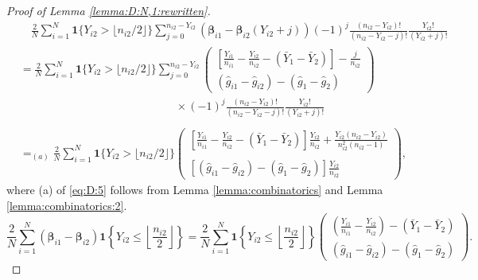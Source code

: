 \documentclass[10pt,a4paper]{amsart}
\begin{document}
\begin{proof}[Proof of Lemma \ref{lemma:D:N,1:rewritten}]
\begin{equation}\label{eq:D:5}
\begin{array}{rl}
&\displaystyle\quad\frac{2}{N}\sum_{i=1}^N\mathbf{1}\{Y_{i2} > \lfloor n_{i2}/2\rfloor\}\!\!\!\sum_{j=0}^{n_{i2}-Y_{i2}}\!\!\!(\boldsymbol{\beta}_{i1}-\boldsymbol{\beta}_{i2}(Y_{i2}+j))(-1)^{j}\frac{(n_{i2}-Y_{i2})!}{(n_{i2}-Y_{i2}-j)!}\frac{Y_{i2}!}{(Y_{i2}+j)!}\\
&\displaystyle=\frac{2}{N}\sum_{i=1}^N\mathbf{1}\{Y_{i2} > \lfloor n_{i2}/2\rfloor\}\!\!\!\sum_{j=0}^{n_{i2}-Y_{i2}}\!\!\!\begin{pmatrix}
\displaystyle\left[\frac{Y_{i1}}{n_{i1}}-\frac{Y_{i2}}{n_{i2}}-(\bar{Y}_1-\bar{Y}_2)\right]-\frac{j}{n_{i2}}\\
(\hat{g}_{i1}-\hat{g}_{i2})-(\hat{g}_1-\hat{g}_2)
\end{pmatrix}\\
&\quad\quad\quad\quad\quad\quad\quad\quad\quad\quad\quad\quad\quad\quad\displaystyle\times(-1)^{j}\frac{(n_{i2}-Y_{i2})!}{(n_{i2}-Y_{i2}-j)!}\frac{Y_{i2}!}{(Y_{i2}+j)!}\\
\\
&\displaystyle=_{(a)}\frac{2}{N}\sum_{i=1}^N\mathbf{1}\{Y_{i2} > \lfloor n_{i2}/2\rfloor\}\begin{pmatrix}
\displaystyle\left[\frac{Y_{i1}}{n_{i1}}-\frac{Y_{i2}}{n_{i2}}-(\bar{Y}_1-\bar{Y}_2)\right]\frac{Y_{i2}}{n_{i2}}+\frac{Y_{i2}(n_{i2}-Y_{i2})}{n_{i2}^2(n_{i2}-1)}\\
\\
\displaystyle[(\hat{g}_{i1}-\hat{g}_{i2})-(\hat{g}_1-\hat{g}_2)]\frac{Y_{i2}}{n_{i2}}
\end{pmatrix},
\end{array}
\end{equation}
where (a) of \eqref{eq:D:5} follows from Lemma \ref{lemma:combinatorics} and Lemma \ref{lemma:combinatorics:2}. 
\begin{equation}\label{eq:D:6}
\frac{2}{N}\sum_{i=1}^N(\boldsymbol{\beta}_{i1}-\boldsymbol{\beta}_{i2})\mathbf{1}\left\{Y_{i2}\leq\left\lfloor \frac{n_{i2}}{2}\right\rfloor\right\}=\frac{2}{N}\sum_{i=1}^N\mathbf{1}\left\{Y_{i2}\leq\left\lfloor\frac{n_{i2}}{2}\right\rfloor\right\}\begin{pmatrix}
\displaystyle\left(\frac{Y_{i1}}{n_{i1}}-\frac{Y_{i2}}{n_{i2}}\right)-(\bar{Y}_1-\bar{Y}_2)\\
\displaystyle(\hat{g}_{i1}-\hat{g}_{i2})-(\hat{g}_1-\hat{g}_2)
\end{pmatrix}.
\end{equation}

\end{proof}
\end{document}
